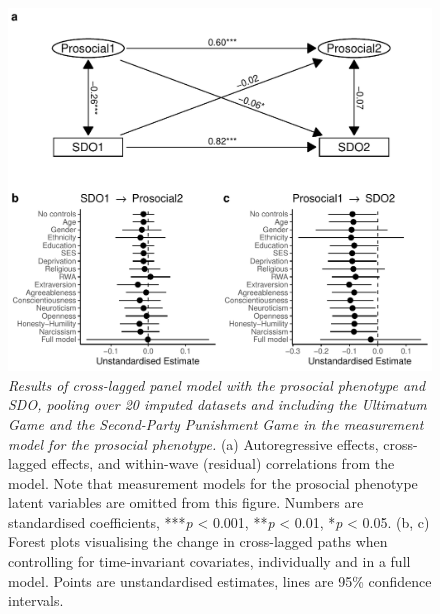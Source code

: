 \documentclass[
  man,floatsintext]{apa6}
\begin{document}
\begin{figure}
\centering
\includegraphics{manuscript_files/figure-latex/clpmPlotSDOdMFull-1.pdf}
\caption{\label{fig:clpmPlotSDOdMFull}\emph{Results of cross-lagged panel model with the
prosocial phenotype and SDO, pooling over 20 imputed datasets and including
the Ultimatum Game and the Second-Party Punishment Game in the measurement model
for the prosocial phenotype.} (a) Autoregressive effects, cross-lagged effects,
and within-wave (residual) correlations from the model. Note that measurement
models for the prosocial phenotype latent variables are omitted from this
figure. Numbers are standardised coefficients, ***\emph{p} \textless{} 0.001, **\emph{p} \textless{}
0.01, *\emph{p} \textless{} 0.05. (b, c) Forest plots visualising the change in cross-lagged
paths when controlling for time-invariant covariates, individually and in a full
model. Points are unstandardised estimates, lines are 95\% confidence intervals.}
\end{figure}

\newpage
\end{document}

